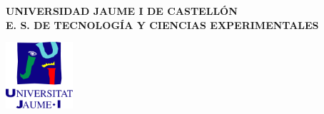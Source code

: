 \thispagestyle{empty}
\begin{center}
{\sffamily \bf
{\Large UNIVERSIDAD JAUME I DE CASTELL\'{O}N}\\

\vspace*{1ex}
{\normalsize E. S. DE TECNOLOG\'{I}A Y CIENCIAS EXPERIMENTALES}\\

\vspace*{15ex}

\centerline{\includegraphics[width=2.5cm]{logo}}

\vspace{\fill}
{\Huge \sc \thetitle \\}

\vspace{\fill}
{\normalsize \sc \theauthor}
\vspace*{34ex}
}
\end{center}

\restoregeometry

